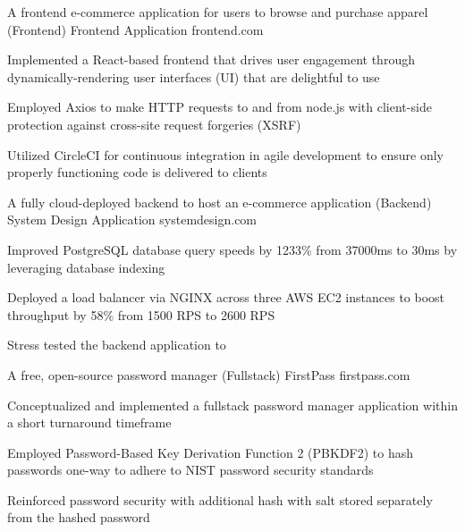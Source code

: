 

\begin{cventries}

  \cventry
    {A frontend e-commerce application for users to browse and purchase apparel (Frontend)} %
    {Frontend Application} %
    {frontend.com} %
    {} %
    {
      \begin{cvitems} %
        \item {Implemented a React-based frontend that drives user engagement through dynamically-rendering user interfaces (UI) that are delightful to use}
        \item {Employed Axios to make HTTP requests to and from node.js with client-side protection against cross-site request forgeries (XSRF)}
        \item {Utilized CircleCI for continuous integration in agile development to ensure only properly functioning code is delivered to clients}
      \end{cvitems}
    }

  \cventry
    {A fully cloud-deployed backend to host an e-commerce application (Backend)} %
    {System Design Application} %
    {systemdesign.com} %
    {} %
    {
      \begin{cvitems} %
        \item {Improved PostgreSQL database query speeds by 1233\% from 37000ms to 30ms by leveraging database indexing}
        \item {Deployed a load balancer via NGINX across three AWS EC2 instances to boost throughput by 58\% from 1500 RPS to 2600 RPS}
        \item {Stress tested the backend application to }
      \end{cvitems}
    }

\cventry
{A free, open-source password manager (Fullstack)} %
{FirstPass} %
{firstpass.com} %
{} %
{
  \begin{cvitems} %
    \item {Conceptualized and implemented a fullstack password manager application within a short turnaround timeframe}
    \item {Employed Password-Based Key Derivation Function 2 (PBKDF2) to hash passwords one-way to adhere to NIST password security standards}
    \item {Reinforced password security with additional hash with salt stored separately from the hashed password}
  \end{cvitems}
}


\end{cventries}

